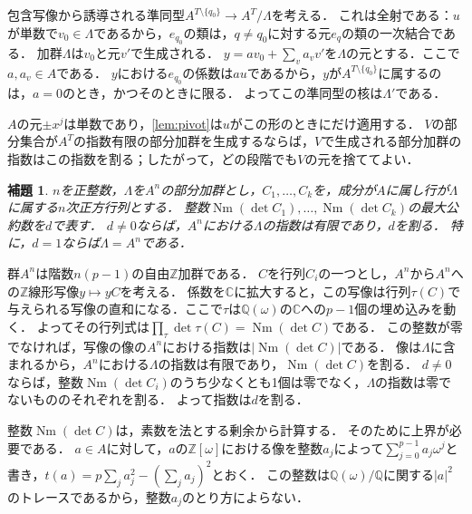 \documentclass[11pt,a4paper]{ltjsarticle}
\makeatletter
\theoremstyle{ja}
\newtheorem{lemma}[theorem]{補題}
\renewenvironment{proof}[1][証明]{\par
  \pushQED{\qed}\normalfont \topsep6\p@\@plus6\p@\relax
  \trivlist
  \item[\hskip\labelsep\bfseries #1]\hspace{1\zw}\ignorespaces
}{\popQED\endtrivlist\@endpefalse}
\makeatother
\begin{document}
\begin{proof}
包含写像から誘導される準同型$A^{T \setminus \{q_0\}} \to A^T/\Lambda$を考える．
これは全射である：$u$が単数で$v_0 \in \Lambda$であるから，$e_{q_0}$の類は，$q \ne q_0$に対する元$e_q$の類の一次結合である．
加群$\Lambda$は$v_0$と元$v'$で生成される．
$y = a v_0 + \sum_{v} a_v v'$を$\Lambda$の元とする．ここで$a, a_v \in A$である．
$y$における$e_{q_0}$の係数は$au$であるから，$y$が$A^{T \setminus \{q_0\}}$に属するのは，$a = 0$のとき，かつそのときに限る．
よってこの準同型の核は$\Lambda'$である．
\end{proof}

$A$の元$\pm x^j$は単数であり，\cref{lem:pivot}は$u$がこの形のときにだけ適用する．
$V$の部分集合が$A^T$の指数有限の部分加群を生成するならば，$V$で生成される部分加群の指数はこの指数を割る；したがって，どの段階でも$V$の元を捨ててよい．

\begin{lemma} \label{lem:det}
$n$を正整数，$\Lambda$を$A^n$の部分加群とし，$C_1, \dots, C_k$を，成分が$A$に属し行が$\Lambda$に属する$n$次正方行列とする．
整数$\operatorname{Nm}(\det C_1), \dots, \operatorname{Nm}(\det C_k)$の最大公約数を$d$で表す．
$d \ne 0$ならば，$A^n$における$\Lambda$の指数は有限であり，$d$を割る．
特に，$d = 1$ならば$\Lambda = A^n$である．
\end{lemma}

\begin{proof}
群$A^n$は階数$n(p-1)$の自由$\mathbb{Z}$加群である．
$C$を行列$C_i$の一つとし，$A^n$から$A^n$への$\mathbb{Z}$線形写像$y \mapsto yC$を考える．
係数を$\mathbb{C}$に拡大すると，この写像は行列$\tau(C)$で与えられる写像の直和になる．ここで$\tau$は$\mathbb{Q}(\omega)$の$\mathbb{C}$への$p - 1$個の埋め込みを動く．
よってその行列式は$\prod_\tau \det \tau(C) = \operatorname{Nm}(\det C)$である．
この整数が零でなければ，写像の像の$A^n$における指数は$|\operatorname{Nm}(\det C)|$である．
像は$\Lambda$に含まれるから，$A^n$における$\Lambda$の指数は有限であり，$\operatorname{Nm}(\det C)$を割る．
$d \ne 0$ならば，整数$\operatorname{Nm}(\det C_i)$のうち少なくとも1個は零でなく，$\Lambda$の指数は零でないもののそれぞれを割る．
よって指数は$d$を割る．
\end{proof}

整数$\operatorname{Nm}(\det C)$は，素数を法とする剰余から計算する．
そのために上界が必要である．
$a \in A$に対して，$a$の$\mathbb{Z}[\omega]$における像を整数$a_j$によって$\sum_{j=0}^{p-1} a_j \omega^j$と書き，$t(a) = p \sum_j a_j^2 - (\sum_j a_j)^2$とおく．
この整数は$\mathbb{Q}(\omega)/\mathbb{Q}$に関する$|a|^2$のトレースであるから，整数$a_j$のとり方によらない．
\end{document}
